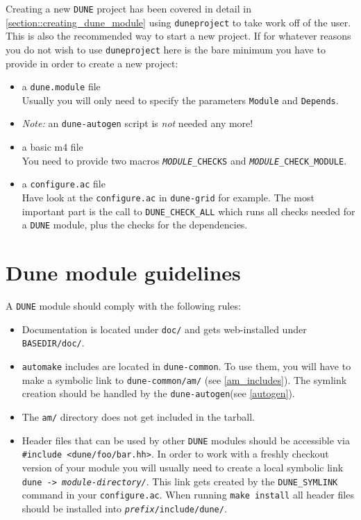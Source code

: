 \documentclass[11pt,a4paper,headinclude,footinclude,DIV16,normalheadings]{scrartcl}
\newcommand{\dune}{\texttt{DUNE}\xspace}
\newcommand{\automake}{\texttt{automake}\xspace}
\newcommand{\autogen}{\texttt{dune-autogen}\xspace}
\newcommand{\configureac}{\texttt{configure.ac}\xspace}
\newcommand{\dunecommon}{\texttt{dune-common}\xspace}
\newcommand{\dunegrid}{\texttt{dune-grid}\xspace}
\newcommand{\duneproject}{\texttt{duneproject}\xspace}
\newcommand{\dunemodule}{\texttt{dune.module}\xspace}
\begin{document}
Creating a new \dune project has been covered in detail in 
\ref{section::creating_dune_module} using \texttt{duneproject} to take
work off of the user. This is also the recommended way to start a new project. 
If for whatever reasons you do not wish to use \duneproject here is 
the bare minimum you have to provide in order to create a new project:
\begin{itemize}
\item a \dunemodule file\\
  Usually you will only need to specify the parameters \texttt{Module}
  and \texttt{Depends}.
\item \emph{Note:} an \autogen script is \emph{not} needed any more!
\item a basic m4 file\\
  You need to provide two macros \texttt{\emph{MODULE}\_CHECKS}
  and \texttt{\emph{MODULE}\_CHECK\_MODULE}.
\item a \configureac file\\
  Have look at the \configureac in \dunegrid for example. The most
  important part is the call to \texttt{DUNE\_CHECK\_ALL} which
  runs all checks needed for a \dune module, plus the checks for the
  dependencies.
\end{itemize}

\section{Dune module guidelines}\label{section::dune_module_guidelines}
\label{guidelines}

A \dune module should comply with the following rules:
\begin{itemize}
\item Documentation is located under \texttt{doc/} and gets
  web-installed under \texttt{BASEDIR/doc/}.
\item \automake includes are located in \dunecommon. To use them, you
  will have to make a symbolic link to \texttt{dune-common/am/} (see
  \ref{am_includes}). The symlink creation should be handled by the
  \autogen (see \ref{autogen}).
\item The \texttt{am/} directory does not get included in the tarball.
\item Header files that can be used by other \dune modules should be
  accessible via \verb!#include <dune/foo/bar.hh>!. In order to work
  with a freshly checkout version of your module you will usually need
  to create a local symbolic link \texttt{dune ->
    \textit{module-directory/}}. This link gets created by the
  \texttt{DUNE\_SYMLINK} command in your \configureac. When running
  \texttt{make install} all header files should be installed into
  \texttt{\textit{prefix}/include/dune/}.
\end{itemize}
\end{document}
